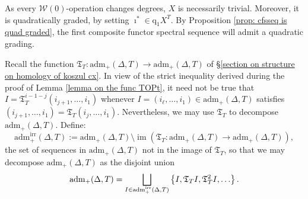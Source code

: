 \documentclass[11pt]{amsart} \renewcommand{\baselinestretch}{1.2}
\theoremstyle{plain}
\theoremstyle{definition}
\DeclareMathOperator{\im}{im}
\renewcommand{\to}{\longrightarrow}
\newcommand{\calw}{\mathcal{W}}
\newcommand{\quadgrad}[1]{\mathrm{q}_{#1}}
\newcommand{\aDT}{\mathrm{adm}_+(\Delta,T)}
\newcommand{\aDTirr}{\mathrm{adm}_+^\mathrm{irr}(\Delta,T)}
\newcommand{\TOP}{\mathfrak{T}}
\begin{document}
\begin{Calculations of HWn}
As every $\calw(0)$-operation changes degrees, $X$ is necessarily trivial. Moreover, it is quadratically graded, by setting $\imath^*\in \quadgrad{1}X^T$. By Proposition \ref{prop: cfsseq is quad graded}, the first composite functor spectral sequence will admit a quadratic grading.


Recall the function $\TOP_T:\aDT\to \aDT$ of \S\ref{section on structure on homology of koszul cx}. In view of the strict inequality derived during the proof of Lemma \ref{lemma on the func TOPt}, it need not be true that $I=\TOP_T^{i-1-j}(i_{j+1},\ldots,i_1)$ whenever  $I=(i_\ell,\ldots,i_1)\in \aDT$ satisfies $(i_{j+1},\ldots,i_1)=\TOP_T(i_{j},\ldots,i_1)$. Nevertheless, we may use $\TOP_T$ to decompose $\aDT$.
Define:
\[\aDTirr:= \aDT\setminus\im(\TOP_T:\aDT\to\aDT),\]
the set of sequences in $\aDT$ not in the image of $\TOP_T$, so that we may decompose $\aDT$ as the disjoint union
\[\aDT=\bigsqcup_{\smash{I\in \aDTirr}}\left\{I,\TOP_T I,\TOP_T^2I,\ldots\right\}.\]








\end{Calculations of HWn}
\end{document}
